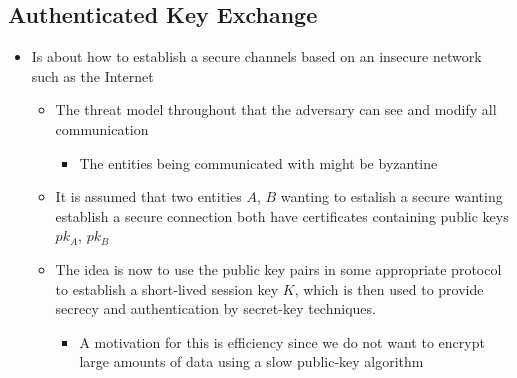 \documentclass[11pt]{article}
\begin{document}
\subsection{Authenticated Key Exchange}
\label{sec:orgbd781d1}
\begin{itemize}
\item Is about how to establish a secure channels based on an insecure network such as the Internet
\begin{itemize}
\item The threat model throughout that the adversary can see and modify all communication
\begin{itemize}
\item The entities being communicated with might be byzantine
\end{itemize}
\item It is assumed that two entities \(A\), \(B\) wanting to estalish a secure wanting establish a secure connection both have certificates containing public keys \(pk_A\), \(pk_B\)
\item The idea is now to use the public key pairs in some appropriate protocol to establish a short-lived session key \(K\), which is then used to provide secrecy and authentication by secret-key techniques.
\begin{itemize}
\item A motivation for this is efficiency since we do not want to encrypt large amounts of data using a slow public-key algorithm
\end{itemize}
\end{itemize}


\end{itemize}
\end{document}
